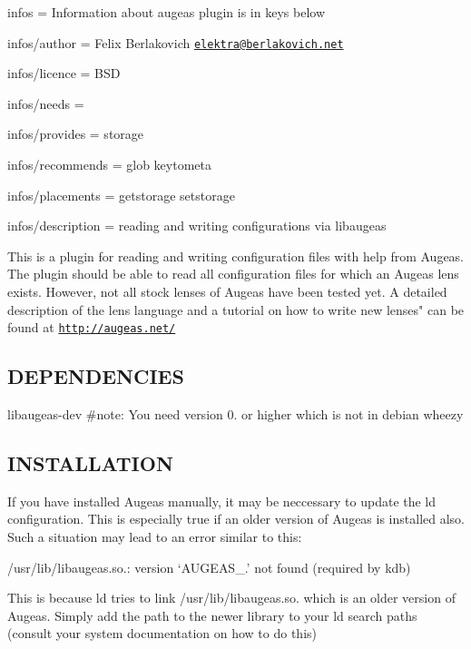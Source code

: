 
\begin{DoxyItemize}
\item infos = Information about augeas plugin is in keys below
\item infos/author = Felix Berlakovich \href{mailto:elektra@berlakovich.net}{\tt elektra@berlakovich.\+net}
\item infos/licence = B\+S\+D
\item infos/needs =
\item infos/provides = storage
\item infos/recommends = glob keytometa
\item infos/placements = getstorage setstorage
\item infos/description = reading and writing configurations via libaugeas
\end{DoxyItemize}

This is a plugin for reading and writing configuration files with help from Augeas. The plugin should be able to read all configuration files for which an Augeas lens exists. However, not all stock lenses of Augeas have been tested yet. A detailed description of the lens language and a tutorial on how to write new lenses" can be found at \href{http://augeas.net/}{\tt http\+://augeas.\+net/}

\subsection*{D\+E\+P\+E\+N\+D\+E\+N\+C\+I\+E\+S}


\begin{DoxyItemize}
\item {\ttfamily libaugeas-\/dev} \#note\+: You need version 0. or higher which is not in debian wheezy
\end{DoxyItemize}

\subsection*{I\+N\+S\+T\+A\+L\+L\+A\+T\+I\+O\+N}

If you have installed Augeas manually, it may be neccessary to update the ld configuration. This is especially true if an older version of Augeas is installed also. Such a situation may lead to an error similar to this\+:

/usr/lib/libaugeas.so.\+: version `\+A\+U\+G\+E\+A\+S\+\_.' not found (required by kdb)

This is because ld tries to link /usr/lib/libaugeas.so. which is an older version of Augeas. Simply add the path to the newer library to your ld search paths (consult your system documentation on how to do this)

